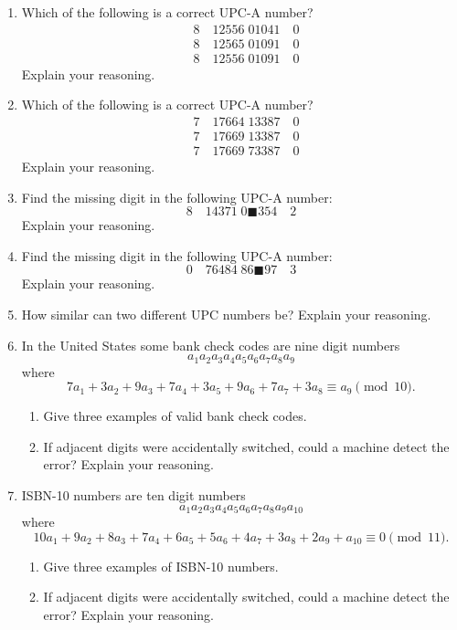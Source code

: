 \begin{problems}
\begin{enumerate}

\item Which of the following is a correct UPC-A number?%
\begin{align*}
&8\quad12556\;01041\quad0\\
&8\quad12565\;01091\quad0\\
&8\quad12556\;01091\quad0
\end{align*}
Explain your reasoning.


\item  Which of the following is a correct UPC-A number?%
\begin{align*}
&7\quad17664\;13387\quad0\\
&7\quad17669\;13387\quad0\\
&7\quad17669\;73387\quad0
\end{align*}
Explain your reasoning.


\item Find the missing digit in the following UPC-A number:
\[
8\quad14371\;0\blacksquare354\quad2
\]
Explain your reasoning.

\item Find the missing digit in the following UPC-A number:
\[
0\quad76484\;86\blacksquare97\quad3
\]
Explain your reasoning.

\item How similar can two different UPC numbers be? Explain your
  reasoning.
\item In the United States some bank check codes are nine digit
  numbers
\[
a_1 a_2 a_3 a_4 a_5 a_6 a_7 a_8 a_9
\] 
where
\[
7a_1 + 3a_2 + 9a_3 + 7a_4 + 3a_5 + 9a_6 + 7 a_7 + 3a_8 \equiv a_9 \pmod{10}.
\]
\begin{enumerate}
\item Give three examples of valid bank check codes.
\item If adjacent digits were accidentally switched, could a machine
  detect the error? Explain your reasoning.
\end{enumerate}
\item ISBN-10 numbers are ten digit
  numbers
\[
a_1 a_2 a_3 a_4 a_5 a_6 a_7 a_8 a_9 a_{10}
\] 
where
\[
10a_1 + 9a_2 + 8a_3 + 7a_4 + 6a_5 + 5a_6 + 4a_7 + 3a_8 +2a_9+a_{10}\equiv 0 \pmod{11}.
\]
\begin{enumerate}
\item Give three examples of ISBN-10 numbers.
\item If adjacent digits were accidentally switched, could a machine
  detect the error? Explain your reasoning.
\end{enumerate}
\end{enumerate}
\end{problems}


